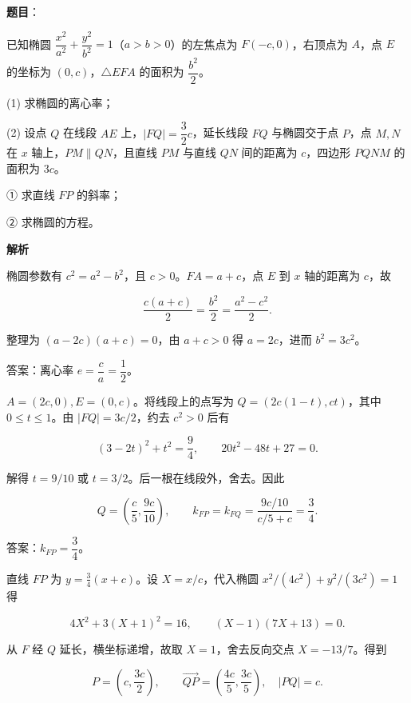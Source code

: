\begin{answer}

\textbf{题目}：

已知椭圆 $\dfrac{x^2}{a^2}+\dfrac{y^2}{b^2}=1$（$a>b>0$）的左焦点为 $F(-c,0)$，右顶点为 $A$，点 $E$ 的坐标为 $(0,c)$，$\triangle EFA$ 的面积为 $\dfrac{b^2}{2}$。

(1)   求椭圆的离心率；

(2)   设点 $Q$ 在线段 $AE$ 上，$|FQ|=\dfrac32c$，延长线段 $FQ$ 与椭圆交于点 $P$，点 $M,N$ 在 $x$ 轴上，$PM\parallel QN$，且直线 $PM$ 与直线 $QN$ 间的距离为 $c$，四边形 $PQNM$ 的面积为 $3c$。

① 求直线 $FP$ 的斜率；

② 求椭圆的方程。

\textbf{解析}


椭圆参数有 $c^2=a^2-b^2$，且 $c>0$。$FA=a+c$，点 $E$ 到 $x$ 轴的距离为 $c$，故

\nopagebreak[4]
\[\frac{c(a+c)}2=\frac{b^2}2=\frac{a^2-c^2}2.\]

整理为 $(a-2c)(a+c)=0$，由 $a+c>0$ 得 $a=2c$，进而 $b^2=3c^2$。

答案：离心率 $\boxed{e=\dfrac ca=\dfrac12}$。


$A=(2c,0),E=(0,c)$。将线段上的点写为 $Q=(2c(1-t),ct)$，其中 $0\leqslant t\leqslant1$。由 $|FQ|=3c/2$，约去 $c^2>0$ 后有

\nopagebreak[4]
\[ (3-2t)^2+t^2=\frac94,\qquad 20t^2-48t+27=0.\]

解得 $t=9/10$ 或 $t=3/2$。后一根在线段外，舍去。因此

\nopagebreak[4]
\[Q=\left(\frac c5,\frac{9c}{10}\right),\qquad k_{FP}=k_{FQ}=\frac{9c/10}{c/5+c}=\frac34.\]

答案：$\boxed{k_{FP}=\dfrac34}$。


直线 $FP$ 为 $y=\frac34(x+c)$。设 $X=x/c$，代入椭圆 $x^2/(4c^2)+y^2/(3c^2)=1$ 得

\nopagebreak[4]
\[4X^2+3(X+1)^2=16,\qquad (X-1)(7X+13)=0.\]

从 $F$ 经 $Q$ 延长，横坐标递增，故取 $X=1$，舍去反向交点 $X=-13/7$。得到

\nopagebreak[4]
\[P=\left(c,\frac{3c}{2}\right),\qquad \overrightarrow{QP}=\left(\frac{4c}5,\frac{3c}5\right),\quad |PQ|=c.\]


\end{answer}
